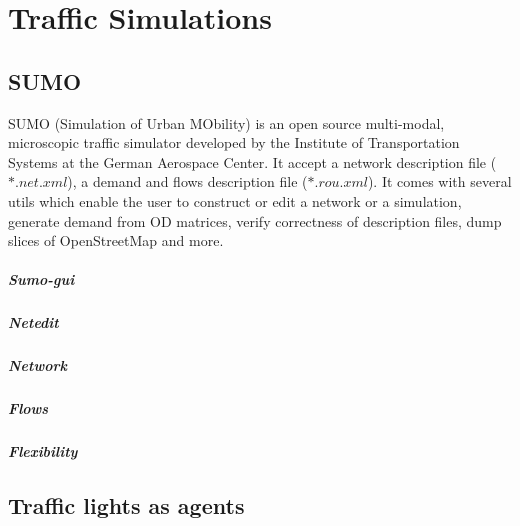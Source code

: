 \chapter{Traffic Simulations}

\section{SUMO}

SUMO (Simulation of Urban MObility) is an open source multi-modal, microscopic traffic simulator developed by the Institute of Transportation Systems at the German Aerospace Center. It accept a network description file ($*.net.xml$), a demand and flows description file ($*.rou.xml$). It comes with several utils which enable the user to construct or edit a network or a simulation, generate demand from OD matrices, verify correctness of description files, dump slices of OpenStreetMap and more.

\paragraph{Sumo-gui}

\paragraph{Netedit}

\paragraph{Network}


\paragraph{Flows}


\paragraph{Flexibility}


\section{Traffic lights as agents}

